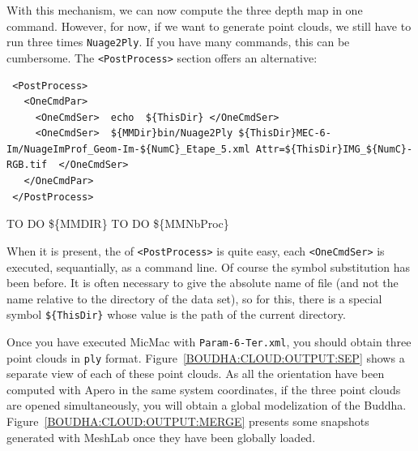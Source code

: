 With this mechanism, we can now compute the three depth map in one command.
However, for now, if we want to generate point clouds, we still have to run three
times {\tt Nuage2Ply}. If you have many commands, this can be cumbersome. The
{\tt <PostProcess>} section offers an alternative:


{\scriptsize
\begin{verbatim}
 <PostProcess>
   <OneCmdPar>
     <OneCmdSer>  echo  ${ThisDir} </OneCmdSer>
     <OneCmdSer>  ${MMDir}bin/Nuage2Ply ${ThisDir}MEC-6-Im/NuageImProf_Geom-Im-${NumC}_Etape_5.xml Attr=${ThisDir}IMG_${NumC}-RGB.tif  </OneCmdSer>
   </OneCmdPar>
 </PostProcess>

\end{verbatim}
}

TO DO \$\{MMDIR\}
TO DO \$\{MMNbProc\}

When it is present, the  of {\tt <PostProcess>} is quite easy, each {\tt <OneCmdSer>} is
executed, sequantially, as a command line. Of course the symbol substitution has been 
before. It is often necessary to give the absolute name of file (and not the name relative to
the directory of the data set), so for this, there is a special symbol {\tt \$\{ThisDir\}} whose 
value is the path of the current directory.

Once you have executed MicMac with {\tt Param-6-Ter.xml}, you should obtain
three point clouds in {\tt ply} format.
Figure~\ref{BOUDHA:CLOUD:OUTPUT:SEP} shows a separate view of
each of these point clouds.
As all the orientation have been computed with Apero in the same system
coordinates, if the three point clouds are opened simultaneously, you will obtain
a global modelization of the Buddha.  Figure~\ref{BOUDHA:CLOUD:OUTPUT:MERGE}
presents some snapshots generated with MeshLab once they have been globally loaded.

